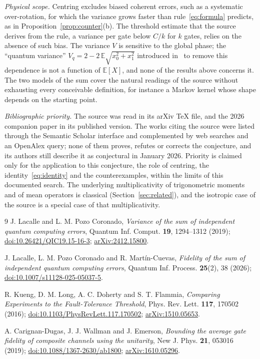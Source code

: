 \documentclass[11pt,a4paper]{article}
\theoremstyle{definition}
\theoremstyle{plain}
\newcommand{\E}{\mathbb{E}}
\begin{document}
\emph{Physical scope.} Centring excludes biased coherent errors, such as a
systematic over-rotation, for which the variance grows faster than
rule~\eqref{eq:formula} predicts, as in
Proposition~\ref{prop:counter}(b). The threshold estimate that the source
derives from the rule, a variance per gate below $C/k$ for $k$ gates, relies on
the absence of such bias. The variance $V$ is sensitive to the global phase;
the ``quantum variance'' $V_q=2-2\,\E\sqrt{x_0^2+x_1^2}$ introduced
in~\cite{LacallePozo2019} to remove this dependence is not a function of
$\E[X]$, and none of the results above concerns it. The two models of the sum
cover the natural readings of the source without exhausting every
conceivable definition, for instance a Markov kernel whose shape depends on
the starting point.

\emph{Bibliographic priority.} The source was read in its arXiv \TeX{} file,
and the 2026 companion paper in its published version. The works citing the
source were listed through the Semantic Scholar interface and complemented by
web searches and an OpenAlex query; none of them proves, refutes or corrects
the conjecture, and its authors still describe it as conjectural in January
2026. Priority is claimed only for the application to this conjecture, the
role of centring, the identity~\eqref{eq:identity} and the counterexamples,
within the limits of this documented search. The underlying multiplicativity
of trigonometric moments and of mean operators is classical
(Section~\ref{sec:related}), and the isotropic case of the source is a
special case of that multiplicativity.

\begingroup\small
\begin{thebibliography}{9}
\setlength{\itemsep}{2pt}
J. Lacalle and L. M. Pozo Coronado,
\emph{Variance of the sum of independent quantum computing errors},
Quantum Inf. Comput. \textbf{19}, 1294--1312 (2019);
\href{https://doi.org/10.26421/QIC19.15-16-3}{doi:10.26421/QIC19.15-16-3};
\href{https://arxiv.org/abs/2412.15800}{arXiv:2412.15800}.

J. Lacalle, L. M. Pozo Coronado and R. Mart\'in-Cuevas,
\emph{Fidelity of the sum of independent quantum computing errors},
Quantum Inf. Process. \textbf{25}(2), 38 (2026);
\href{https://doi.org/10.1007/s11128-025-05037-5}{doi:10.1007/s11128-025-05037-5}.

R. Kueng, D. M. Long, A. C. Doherty and S. T. Flammia,
\emph{Comparing Experiments to the Fault-Tolerance Threshold},
Phys. Rev. Lett. \textbf{117}, 170502 (2016);
\href{https://doi.org/10.1103/PhysRevLett.117.170502}{doi:10.1103/PhysRevLett.117.170502};
\href{https://arxiv.org/abs/1510.05653}{arXiv:1510.05653}.

A. Carignan-Dugas, J. J. Wallman and J. Emerson,
\emph{Bounding the average gate fidelity of composite channels using the unitarity},
New J. Phys. \textbf{21}, 053016 (2019);
\href{https://doi.org/10.1088/1367-2630/ab1800}{doi:10.1088/1367-2630/ab1800};
\href{https://arxiv.org/abs/1610.05296}{arXiv:1610.05296}.
\end{thebibliography}
\endgroup
\end{document}
